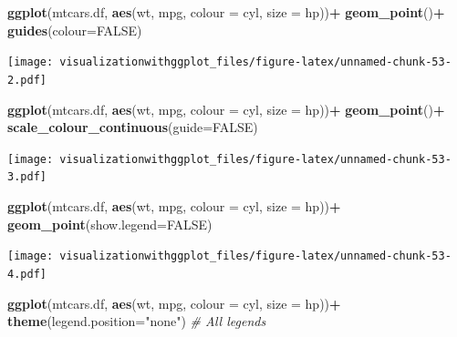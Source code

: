 \documentclass[]{krantz}
\makeatletter
\newenvironment{Shaded}{\begin{snugshade}}{\end{snugshade}}
\newcommand{\KeywordTok}[1]{\textcolor[rgb]{0.13,0.29,0.53}{\textbf{#1}}}
\newcommand{\DataTypeTok}[1]{\textcolor[rgb]{0.13,0.29,0.53}{#1}}
\newcommand{\StringTok}[1]{\textcolor[rgb]{0.31,0.60,0.02}{#1}}
\newcommand{\CommentTok}[1]{\textcolor[rgb]{0.56,0.35,0.01}{\textit{#1}}}
\newcommand{\OtherTok}[1]{\textcolor[rgb]{0.56,0.35,0.01}{#1}}
\newcommand{\OperatorTok}[1]{\textcolor[rgb]{0.81,0.36,0.00}{\textbf{#1}}}
\newcommand{\NormalTok}[1]{#1}
\newenvironment{kframe}{%
\medskip{}
\setlength{\fboxsep}{.8em}
 \def\at@end@of@kframe{}%
 \ifinner\ifhmode%
  \def\at@end@of@kframe{\end{minipage}}%
  \begin{minipage}{\columnwidth}%
 \fi\fi%
 \def\FrameCommand##1{\hskip\@totalleftmargin \hskip-\fboxsep
 \colorbox{shadecolor}{##1}\hskip-\fboxsep
     \hskip-\linewidth \hskip-\@totalleftmargin \hskip\columnwidth}%
 \MakeFramed {\advance\hsize-\width
   \@totalleftmargin\z@ \linewidth\hsize
   \@setminipage}}%
 {\par\unskip\endMakeFramed%
 \at@end@of@kframe}
\renewenvironment{Shaded}{\begin{kframe}}{\end{kframe}}
\theoremstyle{definition}
\theoremstyle{definition}
\theoremstyle{definition}
\theoremstyle{remark}
\makeatother
\begin{document}
\begin{Shaded}
\begin{Highlighting}[]
\KeywordTok{ggplot}\NormalTok{(mtcars.df, }\KeywordTok{aes}\NormalTok{(wt, mpg, }\DataTypeTok{colour =}\NormalTok{ cyl, }\DataTypeTok{size =}\NormalTok{ hp))}\OperatorTok{+}
\StringTok{  }\KeywordTok{geom_point}\NormalTok{()}\OperatorTok{+}
\StringTok{  }\KeywordTok{guides}\NormalTok{(}\DataTypeTok{colour=}\OtherTok{FALSE}\NormalTok{)}
\end{Highlighting}
\end{Shaded}

\texttt{[image: visualizationwithggplot\_files/figure-latex/unnamed-chunk-53-2.pdf]}

\begin{Shaded}
\begin{Highlighting}[]
\KeywordTok{ggplot}\NormalTok{(mtcars.df, }\KeywordTok{aes}\NormalTok{(wt, mpg, }\DataTypeTok{colour =}\NormalTok{ cyl, }\DataTypeTok{size =}\NormalTok{ hp))}\OperatorTok{+}
\StringTok{  }\KeywordTok{geom_point}\NormalTok{()}\OperatorTok{+}
\KeywordTok{scale_colour_continuous}\NormalTok{(}\DataTypeTok{guide=}\OtherTok{FALSE}\NormalTok{) }
\end{Highlighting}
\end{Shaded}

\texttt{[image: visualizationwithggplot\_files/figure-latex/unnamed-chunk-53-3.pdf]}

\begin{Shaded}
\begin{Highlighting}[]
\KeywordTok{ggplot}\NormalTok{(mtcars.df, }\KeywordTok{aes}\NormalTok{(wt, mpg, }\DataTypeTok{colour =}\NormalTok{ cyl, }\DataTypeTok{size =}\NormalTok{ hp))}\OperatorTok{+}
\StringTok{  }\KeywordTok{geom_point}\NormalTok{(}\DataTypeTok{show.legend=}\OtherTok{FALSE}\NormalTok{)}
\end{Highlighting}
\end{Shaded}

\texttt{[image: visualizationwithggplot\_files/figure-latex/unnamed-chunk-53-4.pdf]}

\begin{Shaded}
\begin{Highlighting}[]
\KeywordTok{ggplot}\NormalTok{(mtcars.df, }\KeywordTok{aes}\NormalTok{(wt, mpg, }\DataTypeTok{colour =}\NormalTok{ cyl, }\DataTypeTok{size =}\NormalTok{ hp))}\OperatorTok{+}
\KeywordTok{theme}\NormalTok{(}\DataTypeTok{legend.position=}\StringTok{"none"}\NormalTok{) }\CommentTok{# All legends}
\end{Highlighting}
\end{Shaded}
\end{document}
